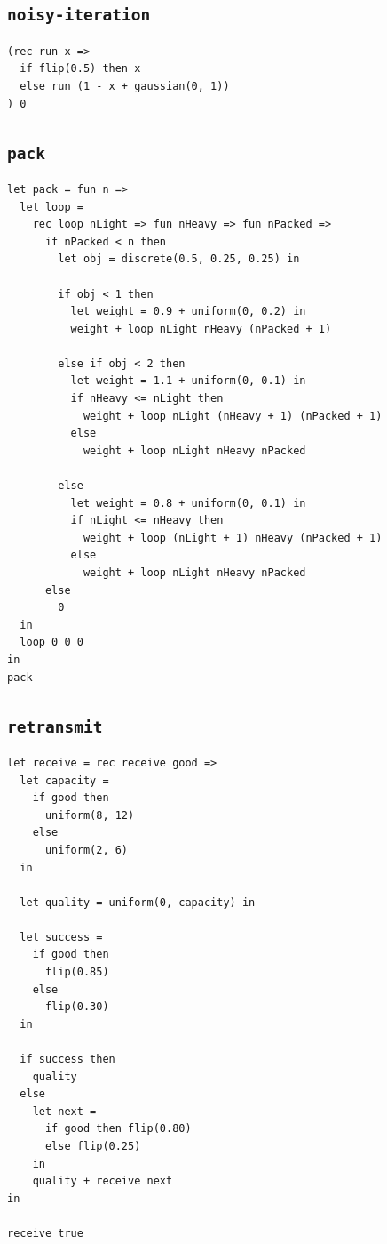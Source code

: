 \subsection{\texttt{noisy-iteration}}

\begin{lstlisting}[breaklines=true]
(rec run x =>
  if flip(0.5) then x
  else run (1 - x + gaussian(0, 1))
) 0
\end{lstlisting}

\subsection{\texttt{pack}}

\begin{lstlisting}[breaklines=true]
let pack = fun n =>
  let loop =
    rec loop nLight => fun nHeavy => fun nPacked =>
      if nPacked < n then
        let obj = discrete(0.5, 0.25, 0.25) in

        if obj < 1 then
          let weight = 0.9 + uniform(0, 0.2) in
          weight + loop nLight nHeavy (nPacked + 1)

        else if obj < 2 then
          let weight = 1.1 + uniform(0, 0.1) in
          if nHeavy <= nLight then
            weight + loop nLight (nHeavy + 1) (nPacked + 1)
          else
            weight + loop nLight nHeavy nPacked

        else
          let weight = 0.8 + uniform(0, 0.1) in
          if nLight <= nHeavy then
            weight + loop (nLight + 1) nHeavy (nPacked + 1)
          else
            weight + loop nLight nHeavy nPacked
      else
        0
  in
  loop 0 0 0
in
pack
\end{lstlisting}

\subsection{\texttt{retransmit}}

\begin{lstlisting}[breaklines=true]
let receive = rec receive good =>
  let capacity =
    if good then
      uniform(8, 12)
    else
      uniform(2, 6)
  in

  let quality = uniform(0, capacity) in

  let success =
    if good then
      flip(0.85)
    else
      flip(0.30)
  in

  if success then
    quality
  else
    let next =
      if good then flip(0.80)
      else flip(0.25)
    in
    quality + receive next
in

receive true
\end{lstlisting}

